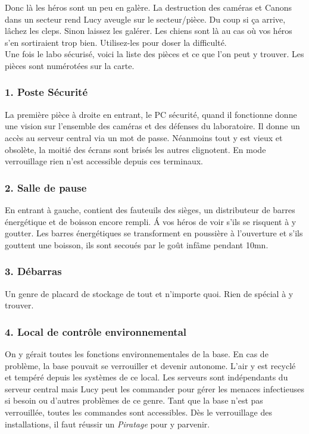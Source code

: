 Donc là les héros sont un peu en galère. La destruction des caméras et Canons dans un secteur rend Lucy aveugle sur le secteur/pièce. Du coup si ça arrive, lâchez les cleps. Sinon laissez les galérer. Les chiens sont là au cas où vos héros s’en sortiraient trop bien. Utilisez-les pour doser la difficulté.\\

Une fois le labo sécurisé, voici la liste des pièces et ce que l’on peut y trouver. Les pièces sont numérotées sur la carte.

\subsubsection{1. Poste Sécurité}
La première pièce à droite en entrant, le PC sécurité, quand il fonctionne donne une vision sur l’ensemble des caméras et des défenses du laboratoire. Il donne un accès au serveur central via un mot de passe. Néanmoins tout y est vieux et obsolète, la moitié des écrans sont brisés les autres clignotent. En mode verrouillage rien n’est accessible depuis ces terminaux.

\subsubsection{2. Salle de pause}
En entrant à gauche, contient des fauteuils des sièges, un distributeur de barres énergétique et de boisson encore rempli. \'A vos héros de voir s’ils se risquent à y goutter. Les barres énergétiques se transforment en poussière à l’ouverture et s’ils gouttent une boisson, ils sont secoués par le goût infâme pendant 10mn.

\subsubsection{3. Débarras}
Un genre de placard de stockage de tout et n’importe quoi. Rien de spécial à y trouver.

\subsubsection{4. Local de contrôle environnemental}
On y gérait toutes les fonctions environnementales de la base. En cas de problème, la base pouvait se verrouiller et devenir autonome. L’air y est recyclé et tempéré depuis les systèmes de ce local. Les serveurs sont indépendants du serveur central mais Lucy peut les commander pour gérer les menaces infectieuses si besoin ou d’autres problèmes de ce genre. Tant que la base n’est pas verrouillée, toutes les commandes sont accessibles. Dès le verrouillage des installations, il faut réussir un \textit{Piratage} pour y parvenir.

